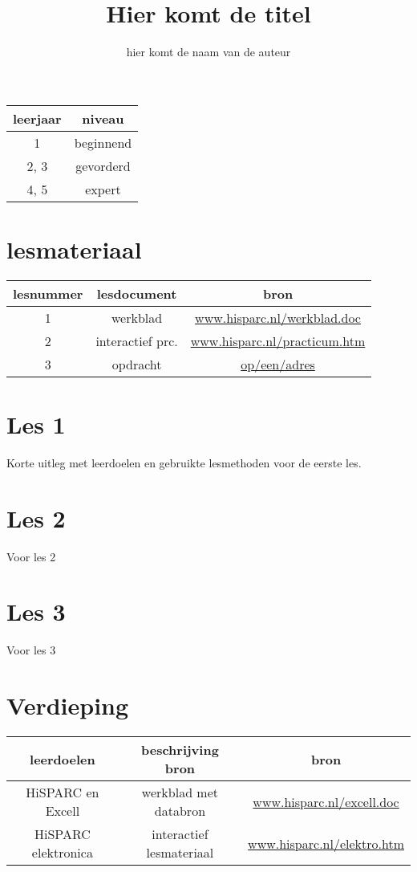 

\title{Hier komt de titel}
\author{hier komt de naam van de auteur}



\maketitle

\begin{tabular}{|c|c|}
\hline 
leerjaar & niveau \tabularnewline
\hline 
1 & beginnend \tabularnewline
\hline 
2, 3 & gevorderd \tabularnewline
\hline 
4, 5 & expert \tabularnewline
\hline 
\end{tabular}

\section{lesmateriaal}

\begin{tabular}{ |c|c|c|}
\hline
lesnummer & lesdocument & bron \tabularnewline 
\hline
1 & werkblad & \url{www.hisparc.nl/werkblad.doc} \tabularnewline
\hline
2 & interactief prc. & \url{www.hisparc.nl/practicum.htm} \tabularnewline
\hline
3 & opdracht & \url{op/een/adres} \tabularnewline
\hline
\end{tabular}

\section{Les 1}

Korte uitleg met leerdoelen en gebruikte lesmethoden voor de eerste les.

\section{Les 2}

Voor les 2

\section{Les 3}

Voor les 3

\section{Verdieping}

\begin{tabular}{|c|c|c|} 
\hline
leerdoelen & beschrijving bron & bron \tabularnewline
\hline
HiSPARC en Excell & werkblad met databron & \url{www.hisparc.nl/excell.doc} \tabularnewline
\hline
HiSPARC  elektronica & interactief lesmateriaal & \url{www.hisparc.nl/elektro.htm} \tabularnewline
\hline
\end{tabular}


